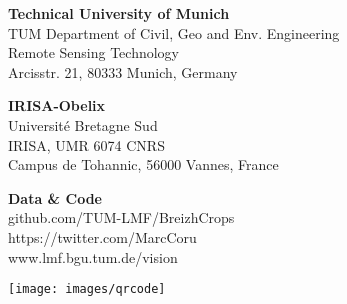 \documentclass[a0]{tumposter}
\begin{document}
\begin{footer}
	\begin{minipage}{.33\textwidth}
		\textbf{Technical University of Munich}\footnotemark[1]\\
		TUM Department of Civil, Geo and Env. Engineering \\
		Remote Sensing Technology \\
		Arcisstr. 21, 80333 Munich, Germany
	\end{minipage}
	\begin{minipage}{.33\textwidth}
		\textbf{IRISA-Obelix}\footnotemark[2]\\
		Université Bretagne Sud \\
		IRISA, UMR 6074 CNRS \\
		Campus de Tohannic, 56000 Vannes, France
		
	\end{minipage}
	\begin{minipage}{.23\textwidth}
		\textbf{Data \& Code} \\
		{github.com/TUM-LMF/BreizhCrops} \\
		{https://twitter.com/MarcCoru} \\
		www.lmf.bgu.tum.de/vision
	\end{minipage}
	\begin{minipage}{.10\textwidth}
		\hfill\texttt{[image: images/qrcode]}\\
		
	\end{minipage}

	
\end{footer}
\end{document}
